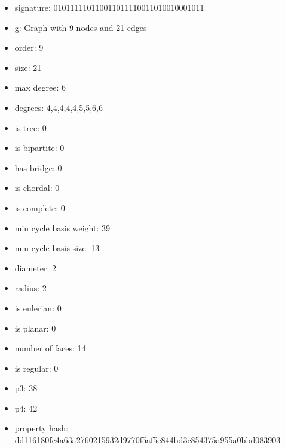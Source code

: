 \newpage
\begin{figure}
\end{figure}
\begin{itemize}
\item signature: 010111110110011011110011010010001011
\item g: Graph with 9 nodes and 21 edges
\item order: 9
\item size: 21
\item max degree: 6
\item degrees: 4,4,4,4,4,5,5,6,6
\item is tree: 0
\item is bipartite: 0
\item has bridge: 0
\item is chordal: 0
\item is complete: 0
\item min cycle basis weight: 39
\item min cycle basis size: 13
\item diameter: 2
\item radius: 2
\item is eulerian: 0
\item is planar: 0
\item number of faces: 14
\item is regular: 0
\item p3: 38
\item p4: 42
\item property hash: dd116180fc4a63a2760215932d9770f5af5e844bd3c854375a955a0bbd083903
\end{itemize}

